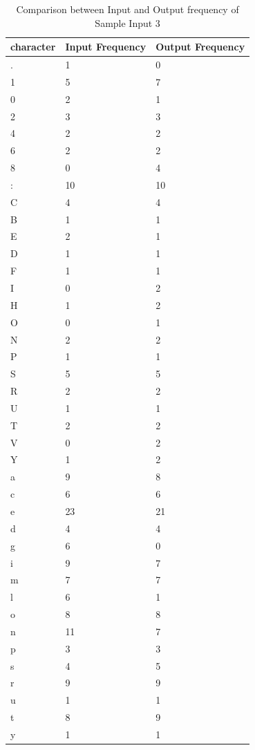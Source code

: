 \begin{table}[H]
\centering
\begin{tabular}{|p{2cm}|p{2cm}|p{2cm}|}
\hline
character & Input Frequency & Output Frequency \\
\hline
. & 1 & 0\\
\hline
1 & 5 & 7\\
\hline
0 & 2 & 1\\
\hline
2 & 3 & 3\\
\hline
4 & 2 & 2\\
\hline
6 & 2 & 2\\
\hline
8 & 0 & 4\\
\hline
: & 10 & 10\\
\hline
C & 4 & 4\\
\hline
B & 1 & 1\\
\hline
E & 2 & 1\\
\hline
D & 1 & 1\\
\hline
F & 1 & 1\\
\hline
I & 0 & 2\\
\hline
H & 1 & 2\\
\hline
O & 0 & 1\\
\hline
N & 2 & 2\\
\hline
P & 1 & 1\\
\hline
S & 5 & 5\\
\hline
R & 2 & 2\\
\hline
U & 1 & 1\\
\hline
T & 2 & 2\\
\hline
V & 0 & 2\\
\hline
Y & 1 & 2\\
\hline
a & 9 & 8\\
\hline
c & 6 & 6\\
\hline
e & 23 & 21\\
\hline
d & 4 & 4\\
\hline
g & 6 & 0\\
\hline
i & 9 & 7\\
\hline
m & 7 & 7\\
\hline
l & 6 & 1\\
\hline
o & 8 & 8\\
\hline
n & 11 & 7\\
\hline
p & 3 & 3\\
\hline
s & 4 & 5\\
\hline
r & 9 & 9\\
\hline
u & 1 & 1\\
\hline
t & 8 & 9\\
\hline
y & 1 & 1\\
\hline
\end{tabular}
\caption {Comparison between Input and Output frequency of Sample Input 3}
\label {tab:Table3}
\end{table}

